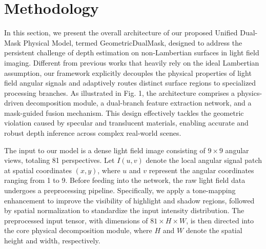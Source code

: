 \section{Methodology}

In this section, we present the overall architecture of our proposed Unified Dual-Mask Physical Model, termed GeometricDualMask, designed to address the persistent challenge of depth estimation on non-Lambertian surfaces in light field imaging. Different from previous works that heavily rely on the ideal Lambertian assumption, our framework explicitly decouples the physical properties of light field angular signals and adaptively routes distinct surface regions to specialized processing branches. As illustrated in Fig. 1, the architecture comprises a physics-driven decomposition module, a dual-branch feature extraction network, and a mask-guided fusion mechanism. This design effectively tackles the geometric violation caused by specular and translucent materials, enabling accurate and robust depth inference across complex real-world scenes.

The input to our model is a dense light field image consisting of $9 \times 9$ angular views, totaling 81 perspectives. Let $I(u,v)$ denote the local angular signal patch at spatial coordinates $(x,y)$, where $u$ and $v$ represent the angular coordinates ranging from 1 to 9. Before feeding into the network, the raw light field data undergoes a preprocessing pipeline. Specifically, we apply a tone-mapping enhancement  to improve the visibility of highlight and shadow regions, followed by spatial normalization to standardize the input intensity distribution. The preprocessed input tensor, with dimensions of $81 \times H \times W$, is then directed into the core physical decomposition module, where $H$ and $W$ denote the spatial height and width, respectively.

